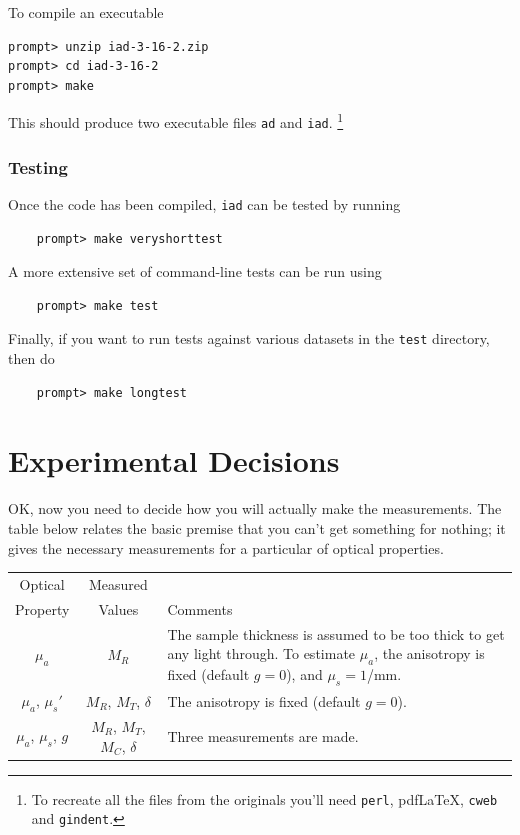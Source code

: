 \documentclass{article}
\newcommand\pdflatex{pdf\LaTeX}
\newcommand\iadprog{\texttt{iad}}
\begin{document}
To compile an executable
\begin{verbatim}
prompt> unzip iad-3-16-2.zip
prompt> cd iad-3-16-2
prompt> make
\end{verbatim}
This should produce two executable files \texttt{ad} and \iadprog{}.%
\footnote{To recreate all the files
from the originals you'll need \texttt{perl}, \pdflatex{}, \texttt{cweb} and \texttt{gindent}.}

\subsubsection{Testing}

Once the code has been compiled, \iadprog{} can be tested by running
\begin{verbatim}
    prompt> make veryshorttest
\end{verbatim}

A more extensive set of command-line tests can be run using
\begin{verbatim}
    prompt> make test
\end{verbatim}


Finally, if you want to run tests against various datasets in the \texttt{test} directory, then do
\begin{verbatim}
    prompt> make longtest
\end{verbatim}

\clearpage

\section{Experimental Decisions}

OK, now you need to decide how you will actually make the measurements. The table
below relates the basic premise that you can't get something for nothing; it gives
the necessary measurements for a particular of optical properties.

\begin{table}[h!]
\begin{center}
\begin{tabular}{c|c|p{7cm}}
 Optical               & Measured                      & \\
 Property              & Values                        & Comments\\
\hline
 $\mu_a$               & $M_R$                         & The sample thickness is assumed to be too thick to get any light through.  To estimate $\mu_a$, the anisotropy is fixed (default $g=0$), and $\mu_s=1$/mm.\\
 $\mu_a$, $\mu_s'$     & $M_R$, $M_T$, $\delta$        & The anisotropy is fixed (default $g=0$).\\
 $\mu_a$, $\mu_s$, $g$ & $M_R$, $M_T$, $M_C$, $\delta$ & Three measurements are made.\\
\end{tabular}
\end{center}
\end{table}
\end{document}
